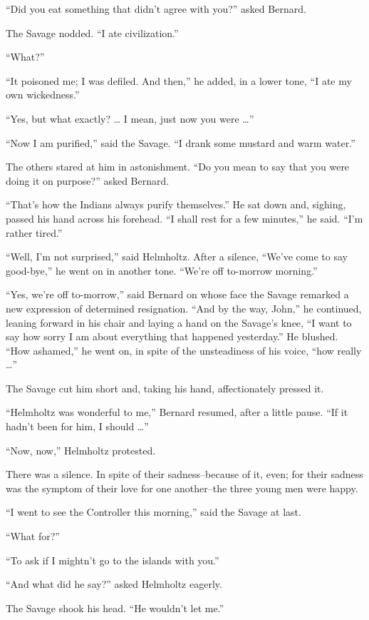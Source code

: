 \documentclass[12pt]{report}
\begin{document}
``Did you eat something that didn't agree with you?'' asked Bernard.

The Savage nodded. ``I ate civilization.''

``What?''

``It poisoned me; I was defiled. And then,'' he added, in a lower tone,
``I ate my own wickedness.''

``Yes, but what exactly? \ldots{} I mean, just now you were \ldots{}''

``Now I am purified,'' said the Savage. ``I drank some mustard and warm
water.''

The others stared at him in astonishment. ``Do you mean to say that you
were doing it on purpose?'' asked Bernard.

``That's how the Indians always purify themselves.'' He sat down and,
sighing, passed his hand across his forehead. ``I shall rest for a few
minutes,'' he said. ``I'm rather tired.''

``Well, I'm not surprised,'' said Helmholtz. After a silence, ``We've
come to say good-bye,'' he went on in another tone. ``We're off
to-morrow morning.''

``Yes, we're off to-morrow,'' said Bernard on whose face the Savage
remarked a new expression of determined resignation. ``And by the way,
John,'' he continued, leaning forward in his chair and laying a hand on
the Savage's knee, ``I want to say how sorry I am about everything that
happened yesterday.'' He blushed. ``How ashamed,'' he went on, in spite
of the unsteadiness of his voice, ``how really \ldots{}''

The Savage cut him short and, taking his hand, affectionately pressed
it.

``Helmholtz was wonderful to me,'' Bernard resumed, after a little
pause. ``If it hadn't been for him, I should \ldots{}''

``Now, now,'' Helmholtz protested.

There was a silence. In spite of their sadness--because of it, even; for
their sadness was the symptom of their love for one another--the three
young men were happy.

``I went to see the Controller this morning,'' said the Savage at last.

``What for?''

``To ask if I mightn't go to the islands with you.''

``And what did he say?'' asked Helmholtz eagerly.

The Savage shook his head. ``He wouldn't let me.''
\end{document}
